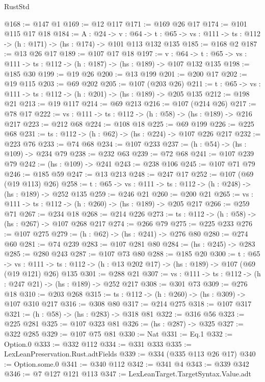 \begin{lexlean}{RustStd}
\begin{coremodule}
@168 := @147 @1
@169 := @12 @117
@171 := @169 @26 @17
@174 := @101 @115 @17 @18
@184 := {A : @24} ->
  {v : @64} ->
  {t : @65} -> {vs : @111} -> {ts : @112} -> (h : @171) -> (hs : @174) -> @101 @113 @132 @135
@185 := @168 @2
@187 := @13 @26 @17
@189 := @107 @17 @18
@197 := {v : @64} ->
  {t : @65} -> {vs : @111} -> {ts : @112} -> (h : @187) -> (hs : @189) -> @107 @132 @135
@198 := @185 @30
@199 := @19 @26
@200 := @13 @199
@201 := @200 @17
@202 := @19 @115
@203 := @69 @202
@205 := @107 (@203 @26)
@211 := {t : @65} -> {vs : @111} -> {ts : @112} -> (h : @201) -> (hs : @189) -> @205 @135
@212 := @198 @21
@213 := @19 @117
@214 := @69 @213
@216 := @107 (@214 @26)
@217 := @78 @17
@222 := {vs : @111} -> {ts : @112} -> (h : @58) -> (hs : @189) -> @216 @217
@223 := @212 @68
@224 := @108 @18
@225 := @69 @199
@226 := @225 @68
@231 := {ts : @112} -> (h : @62) -> (hs : @224) -> @107 @226 @217
@232 := @223 @76
@233 := @74 @68
@234 := @107 @233
@237 := (h : @54) -> (hs : @109) -> @234 @79
@238 := @232 @63
@239 := @72 @68
@241 := @107 @239 @79
@242 := (hs : @109) -> @241
@243 := @238 @106
@245 := @107 @71 @79
@246 := @185 @59
@247 := @13 @213
@248 := @247 @17
@252 := @107 (@69 (@19 @113) @26)
@258 := {t : @65} -> {vs : @111} -> {ts : @112} -> (h : @248) -> (hs : @189) -> @252 @135
@259 := @246 @21
@260 := @200 @21
@265 := {vs : @111} -> {ts : @112} -> (h : @260) -> (hs : @189) -> @205 @217
@266 := @259 @71
@267 := @234 @18
@268 := @214 @226
@273 := {ts : @112} -> (h : @58) -> (hs : @267) -> @107 @268 @217
@274 := @266 @79
@275 := @225 @233
@276 := @107 @275
@279 := (h : @62) -> (hs : @241) -> @276 @80
@280 := @274 @60
@281 := @74 @239
@283 := @107 @281 @80
@284 := (hs : @245) -> @283
@285 := @280 @243
@287 := @107 @73 @80
@288 := @185 @20
@300 := {t : @65} ->
  {vs : @111} -> {ts : @112} -> (h : @13 @202 @17) -> (hs : @189) -> @107 (@69 (@19 @121) @26) @135
@301 := @288 @21
@307 := {vs : @111} -> {ts : @112} -> (h : @247 @21) -> (hs : @189) -> @252 @217
@308 := @301 @73
@309 := @276 @18
@310 := @203 @268
@315 := {ts : @112} -> (h : @260) -> (hs : @309) -> @107 @310 @217
@316 := @308 @80
@317 := @214 @275
@318 := @107 @317
@321 := (h : @58) -> (hs : @283) -> @318 @81
@322 := @316 @56
@323 := @225 @281
@325 := @107 @323 @81
@326 := (hs : @287) -> @325
@327 := @322 @285
@329 := @107 @75 @81
@330 := Nat
@331 := Eq.{1}
@332 := Option.{0}
@333 := @332 @112
@334 := @331 @333
@335 := LexLeanPreservation.Rust.adtFields
@339 := @334 (@335 @113 @26 @17)
@340 := Option.some.{0}
@341 := @340 @112
@342 := @341 @4
@343 := @339 @342
@346 := @7 @127 @121 @113
@347 := LexLeanTarget.TargetSyntax.Value.adt

\end{coremodule}
\end{lexlean}
